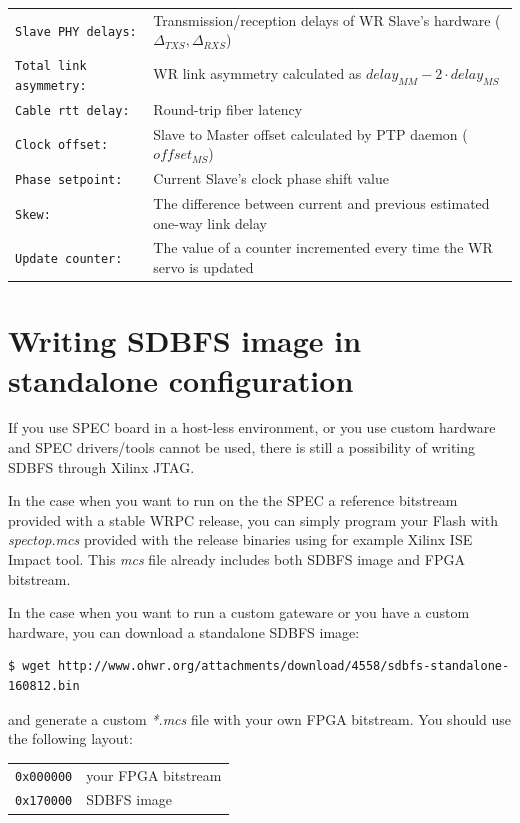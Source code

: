 \documentclass[a4paper, 12pt]{article}
\renewcommand{\_}{\underscore\allowbreak}
\newcommand{\code}[1]{\texttt{#1}}
\begin{document}
\begin{longtable}{  p{4.5cm}  p{10cm} }
  \code{Slave PHY delays:} & Transmission/reception delays of WR Slave's
    hardware ($\Delta_{TXS}, \Delta_{RXS}$)\\

  \code{Total link asymmetry:} & WR link asymmetry calculated as
    $delay_{MM} - 2 \cdot delay_{MS}$\\

  \code{Cable rtt delay:} & Round-trip fiber latency\\

  \code{Clock offset:} & Slave to Master offset calculated by PTP daemon
  ($ offset_{MS} $)\\

  \code{Phase setpoint:} & Current Slave's clock phase shift value\\

  \code{Skew:} & The difference between current and previous estimated
    one-way link delay\\

  \code{Update counter:} & The value of a counter incremented every time
    the WR servo is updated\\

\end{longtable}
\renewcommand\arraystretch{1}


\clearpage
\section{Writing SDBFS image in standalone configuration}
\label{Writing SDBFS image in standalone configuration}

If you use SPEC board in a host-less environment, or you use custom
hardware and SPEC drivers/tools cannot be used, there is still a
possibility of writing SDBFS through Xilinx JTAG.

\vspace{1em}
In the case when you want to run on the the SPEC a reference bitstream provided with a stable
WRPC release, you can simply program your Flash with \textit{spec\_top.mcs}
provided with the release binaries using for example Xilinx ISE Impact tool.
This \textit{mcs} file already includes both SDBFS image and FPGA bitstream.

In the case when you want to run a custom gateware or you have a custom hardware, you can 
download a standalone SDBFS image:
\begin{lstlisting}
$ wget http://www.ohwr.org/attachments/download/4558/sdbfs-standalone-160812.bin
\end{lstlisting}
and generate a custom \textit{*.mcs} file with your own FPGA bitstream. You should
use the following layout:
\begin{longtable}{  l  l }
\code{0x000000} & your FPGA bitstream \\
\code{0x170000} & SDBFS image\\
\end{longtable}
\end{document}
